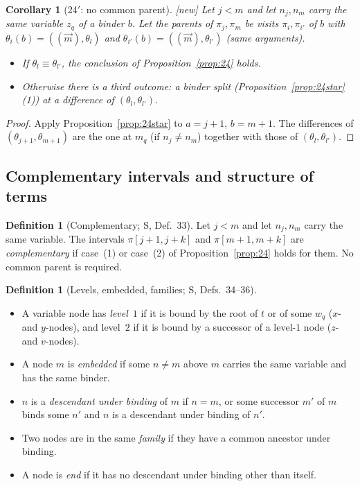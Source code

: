 \documentclass[11pt]{article}
\newcommand{\iv}[2]{\pi[#1,#2]}
\newcommand{\New}{\textsf{[new]}}
\theoremstyle{plain}
\newtheorem{corollary}[theorem]{Corollary}
\theoremstyle{definition}
\newtheorem{definition}[theorem]{Definition}
\theoremstyle{remark}
\begin{document}
\begin{corollary}[24$'$: no common parent]\label{cor:24prime}
\New{} Let $j<m$ and let $n_j,n_m$ carry the same variable $z_q$ of a
binder $b$.  Let the parents of $\pi_j,\pi_m$ be visits $\pi_i,\pi_{i'}$
of $b$ with $\theta_i(b)=((\vec m),\theta_l)$ and
$\theta_{i'}(b)=((\vec m),\theta_{l'})$ (same arguments).
\begin{itemize}
\item If $\theta_l\equiv\theta_{l'}$, the conclusion of
  Proposition~\ref{prop:24} holds.
\item Otherwise there is a third outcome: a binder split
  (Proposition~\ref{prop:24star}(1)) at a difference of
  $(\theta_l,\theta_{l'})$.
\end{itemize}
\end{corollary}
\begin{proof}
Apply Proposition~\ref{prop:24star} to $a=j+1$, $b=m+1$.  The
differences of $(\theta_{j+1},\theta_{m+1})$ are the one at $m_q$ (if
$n_j\ne n_m$) together with those of $(\theta_l,\theta_{l'})$.
\end{proof}

\subsection{Complementary intervals and structure of terms}

\begin{definition}[Complementary; S, Def.~33]\label{def:compl}
Let $j<m$ and let $n_j,n_m$ carry the same variable.  The intervals
$\iv{j+1}{j+k}$ and $\iv{m+1}{m+k}$ are \emph{complementary} if case~(1)
or case~(2) of Proposition~\ref{prop:24} holds for them.  No common
parent is required.
\end{definition}

\begin{definition}[Levels, embedded, families; S, Defs.~34--36]\label{def:struct}
\begin{itemize}
\item A variable node has \emph{level}~$1$ if it is bound by the root
  of $t$ or of some $w_q$ ($x$- and $y$-nodes), and level~$2$ if it is
  bound by a successor of a level-$1$ node ($z$- and $v$-nodes).
\item A node $m$ is \emph{embedded} if some $n\ne m$ above $m$ carries
  the same variable and has the same binder.
\item $n$ is a \emph{descendant under binding} of $m$ if $n=m$, or some
  successor $m'$ of $m$ binds some $n'$ and $n$ is a descendant under
  binding of $n'$.
\item Two nodes are in the same \emph{family} if they have a common
  ancestor under binding.
\item A node is \emph{end} if it has no descendant under binding other
  than itself.
\end{itemize}
\end{definition}
\end{document}
